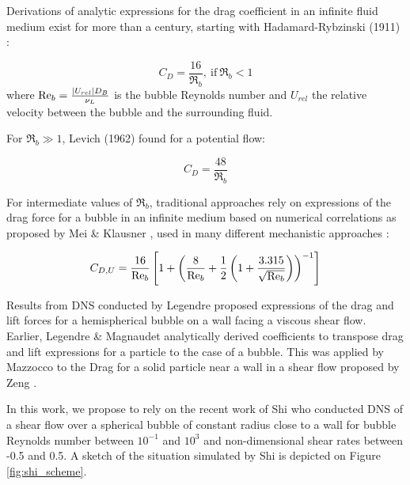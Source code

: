 Derivations of analytic expressions for the drag coefficient in an infinite fluid medium exist for more than a century, starting with Hadamard-Rybzinski (1911) \cite{hadamard_1911}:

\begin{equation}
C_{D} = \frac{16}{\Re_{b}},\ \text{if}\ \Re_{b}<1
\end{equation}
where $\mathrm{Re}_{b} = \frac{\left| U_{rel} \right|D_{B}}{\nu_{L}}$ is the bubble Reynolds number and $U_{rel}$ the relative velocity between the bubble and the surrounding fluid.

For $\Re_{b} \gg 1$, Levich (1962) \cite{levich_1962} found for a potential flow:

\begin{equation}
C_{D} = \frac{48}{\Re_{b}}
\end{equation}


For intermediate values of $\Re_{b}$, traditional approaches rely on expressions of the drag force for a bubble in an infinite medium based on numerical correlations as proposed by Mei \& Klausner \cite{mei_unsteady_1992}, used in many different mechanistic approaches \cite{zeng_unified_1993-1, thorncroft_bubble_2001, chen_prediction_2012, sugrue_modified_2016, ren_development_2020}:

\begin{equation}
C_{D,U} = \frac{16}{\mathrm{Re}_{b}}\left[ 1 + \left( \frac{8}{\mathrm{Re}_{b}}+ \frac{1}{2}\left( 1+\frac{3.315}{\sqrt{\mathrm{Re}_{b}}}  \right) \right)^{-1}  \right]
\label{eq:CD_mei}
\end{equation}


Results from DNS conducted by Legendre \etal \cite{legendre_lift_1998} proposed expressions of the drag and lift forces for a hemispherical bubble on a wall facing a viscous shear flow. Earlier, Legendre \& Magnaudet \cite{legendre_lift_1998} analytically derived coefficients to transpose drag and lift expressions for a particle to the case of a bubble. This was applied by Mazzocco \etal \cite{mazzocco_reassessed_2018} to the Drag for a solid particle near a wall in a shear flow proposed by Zeng \etal \cite{zeng_forces_2009}.

\npar

In this work, we propose to rely on the recent work of Shi \etal \cite{shi_drag_2021} who conducted DNS of a shear flow over a spherical bubble of constant radius close to a wall for bubble Reynolds number between $10^{-1}$ and $10^{3}$ and non-dimensional shear rates between -0.5 and 0.5. A sketch of the situation simulated by Shi \etal is depicted on Figure \ref{fig:shi_scheme}.

